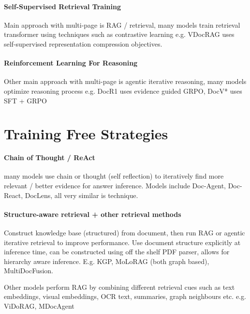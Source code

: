 \documentclass[11pt]{article}
\begin{document}
\paragraph{Self-Supervised Retrieval Training}
Main approach with multi-page is RAG / retrieval, many models train retrieval transformer using techniques such as contrastive learning e.g. VDocRAG uses self-supervised representation compression objectives. 

\paragraph{Reinforcement Learning For Reasoning}
Other main approach with multi-page is agentic iterative reasoning, many models optimize reasoning process e.g. DocR1 uses evidence guided GRPO, DocV* uses SFT + GRPO

\section{Training Free Strategies}


\paragraph{Chain of Thought / ReAct}
many models use chain or thought (self reflection) to iteratively find more relevant / better evidence for answer inference. 
Models include Doc-Agent, Doc-React, DocLens, all very similar is technique.

\paragraph{Structure-aware retrieval + other retrieval methods}
Construct knowledge base (structured) from document, then run RAG or agentic iterative retrieval to improve performance. Use document structure explicitly at inference time, can be constructed using off the shelf PDF parser, allows for hierarchy aware inference. E.g. KGP, MoLoRAG (both graph based), MultiDocFusion.

Other models perform RAG by combining different retrieval cues such as text embeddings, visual embeddings, OCR text, summaries, graph neighbours etc. e.g. ViDoRAG, MDocAgent

\end{document}
